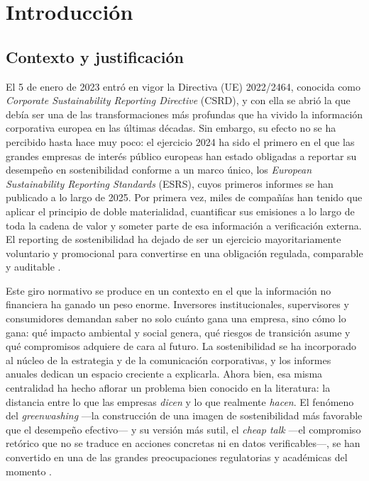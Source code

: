 \chapter{Introducción}
\label{cap:introduccion}

\section{Contexto y justificación}
\label{sec:contexto}

El 5 de enero de 2023 entró en vigor la Directiva (UE) 2022/2464, conocida como
\textit{Corporate Sustainability Reporting Directive} (CSRD), y con ella se abrió la que debía ser una de
las transformaciones más profundas que ha vivido la información corporativa europea en las
últimas décadas. Sin embargo, su efecto no se ha percibido hasta hace muy poco:
el ejercicio 2024 ha sido el primero en el que las grandes empresas de interés público
europeas han estado obligadas a reportar su desempeño en sostenibilidad conforme a un marco
único, los \textit{European Sustainability Reporting Standards} (ESRS), cuyos primeros
informes se han publicado a lo largo de 2025. Por primera vez, miles de compañías han tenido
que aplicar el principio de doble materialidad, cuantificar sus emisiones a lo largo de toda
la cadena de valor y someter parte de esa información a verificación externa. El reporting de
sostenibilidad ha dejado de ser un ejercicio mayoritariamente voluntario y promocional para
convertirse en una obligación regulada, comparable y auditable \parencite{csrd2022}.

Este giro normativo se produce en un contexto en el que la información no financiera ha
ganado un peso enorme. Inversores institucionales, supervisores y consumidores
demandan saber no solo cuánto gana una empresa, sino cómo lo gana: qué impacto ambiental y
social genera, qué riesgos de transición asume y qué compromisos adquiere de cara al futuro.
La sostenibilidad se ha incorporado al núcleo de la estrategia y de la comunicación
corporativas, y los informes anuales dedican un espacio creciente a explicarla. Ahora bien,
esa misma centralidad ha hecho aflorar un problema bien conocido en la literatura: la
distancia entre lo que las empresas \textit{dicen} y lo que realmente \textit{hacen}. El
fenómeno del \textit{greenwashing} —la construcción de una imagen de sostenibilidad más
favorable que el desempeño efectivo— y su versión más sutil, el \textit{cheap talk}
—el compromiso retórico que no se traduce en acciones concretas ni en datos verificables—,
se han convertido en una de las grandes preocupaciones regulatorias y académicas del momento
\parencite{bingler2022}.

